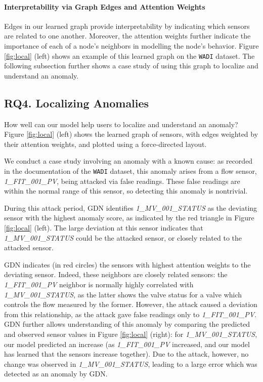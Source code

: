 \documentclass[letterpaper]{article} %
\begin{document}
\paragraph{Interpretability via Graph Edges and Attention Weights} Edges in our learned graph provide interpretability by indicating which sensors are related to one another. Moreover, the attention weights further indicate the importance of each of a node's neighbors in modelling the node's behavior. Figure \ref{fig:local} (left) shows an example of this learned graph on the \texttt{WADI} dataset. The following subsection further shows a case study of using this graph to localize and understand an anomaly. 

\subsection{RQ4. Localizing Anomalies}
How well can our model help users to localize and understand an anomaly? Figure \ref{fig:local} (left) shows the learned graph of sensors, with edges weighted by their attention weights, and plotted using a force-directed layout\cite{kobourov2012spring}. 

We conduct a case study involving an anomaly with a known cause: as recorded in the documentation of the \texttt{WADI} dataset, this anomaly arises from a flow sensor, \emph{1\_FIT\_001\_PV}, being attacked via false readings. These false readings are within the normal range of this sensor, so detecting this anomaly is nontrivial.

During this attack period, \textsc{GDN} identifies \emph{1\_MV\_001\_STATUS} as the deviating sensor with the highest anomaly score, as indicated by the red triangle in Figure \ref{fig:local} (left). The large deviation at this sensor indicates that \emph{1\_MV\_001\_STATUS} could be the attacked sensor, or closely related to the attacked sensor.


\textsc{GDN} indicates (in red circles) the sensors with highest attention weights to the deviating sensor. Indeed, these neighbors are closely related sensors: the \emph{1\_FIT\_001\_PV} neighbor is normally highly correlated with \emph{1\_MV\_001\_STATUS}, as the latter shows the valve status for a valve which controls the flow measured by the former. However, the attack caused a deviation from this relationship, as the attack gave false readings only to \emph{1\_FIT\_001\_PV}. \textsc{GDN} further allows understanding of this anomaly by comparing the predicted and observed sensor values in Figure \ref{fig:local} (right): for \emph{1\_MV\_001\_STATUS}, our model predicted an increase (as \emph{1\_FIT\_001\_PV} increased, and our model has learned that the sensors increase together). Due to the attack, however, no change was observed in \emph{1\_MV\_001\_STATUS}, leading to a large error which was detected as an anomaly by \textsc{GDN}. 
\end{document}
